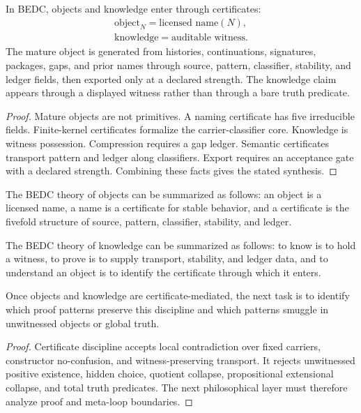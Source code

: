 \begin{theorem}
\label{thm:philosophy-object-knowledge-certificate-synthesis}
In BEDC, objects and knowledge enter through certificates:
$$
\begin{gathered}
\text{object}_{N}=\text{licensed name}(N),\\
\text{knowledge}=\text{auditable witness}.
\end{gathered}
$$
The mature object is generated from histories, continuations,
signatures, packages, gaps, and prior names through source, pattern,
classifier, stability, and ledger fields, then exported only at a
declared strength. The knowledge claim appears through a displayed
witness rather than through a bare truth predicate.
\end{theorem}
\begin{proof}
Mature objects are not primitives. A naming certificate has five
irreducible fields. Finite-kernel certificates formalize the
carrier-classifier core. Knowledge is witness possession. Compression
requires a gap ledger. Semantic certificates transport pattern and
ledger along classifiers. Export requires an acceptance gate with a
declared strength. Combining these facts gives the stated synthesis.
\end{proof}

\begin{corollary}
\label{cor:philosophy-bedc-object-theory}
The BEDC theory of objects can be summarized as follows: an object is a
licensed name, a name is a certificate for stable behavior, and a
certificate is the fivefold structure of source, pattern, classifier,
stability, and ledger.
\end{corollary}

\begin{corollary}
\label{cor:philosophy-bedc-epistemology}
The BEDC theory of knowledge can be summarized as follows: to know is
to hold a witness, to prove is to supply transport, stability, and
ledger data, and to understand an object is to identify the certificate
through which it enters.
\end{corollary}

\begin{corollary}
\label{cor:philosophy-passage-to-logic-meta-loop}
Once objects and knowledge are certificate-mediated, the next task is
to identify which proof patterns preserve this discipline and which
patterns smuggle in unwitnessed objects or global truth.
\end{corollary}
\begin{proof}
Certificate discipline accepts local contradiction over fixed carriers,
constructor no-confusion, and witness-preserving transport. It rejects
unwitnessed positive existence, hidden choice, quotient collapse,
propositional extensional collapse, and total truth predicates. The
next philosophical layer must therefore analyze proof and meta-loop
boundaries.
\end{proof}

